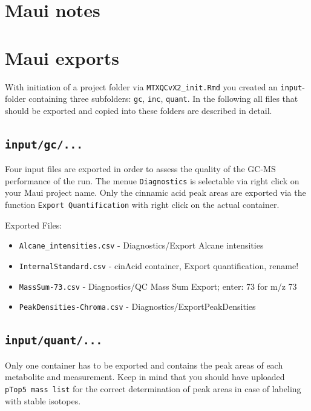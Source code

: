 \documentclass[]{book}
\providecommand{\tightlist}{%
  \setlength{\itemsep}{0pt}\setlength{\parskip}{0pt}}
\theoremstyle{definition}
\theoremstyle{definition}
\theoremstyle{definition}
\theoremstyle{remark}
\begin{document}
\section{Maui notes}\label{maui-notes}

\section{Maui exports}\label{mauiexport}

With initiation of a project folder via \texttt{MTXQCvX2\_init.Rmd} you
created an \texttt{input}-folder containing three subfolders:
\texttt{gc}, \texttt{inc}, \texttt{quant}. In the following all files
that should be exported and copied into these folders are described in
detail.

\subsection{\texorpdfstring{\texttt{input/gc/...}}{input/gc/...}}\label{inputgc...}

Four input files are exported in order to assess the quality of the
GC-MS performance of the run. The menue \texttt{Diagnostics} is
selectable via right click on your Maui project name. Only the cinnamic
acid peak areas are exported via the function
\texttt{Export\ Quantification} with right click on the actual
container.

Exported Files:

\begin{itemize}
\tightlist
\item
  \texttt{Alcane\_intensities.csv} - Diagnostics/Export Alcane
  intensities
\item
  \texttt{InternalStandard.csv} - cinAcid container, Export
  quantification, rename!
\item
  \texttt{MassSum-73.csv} - Diagnostics/QC Mass Sum Export; enter: 73
  for m/z 73
\item
  \texttt{PeakDensities-Chroma.csv} - Diagnostics/ExportPeakDensities
\end{itemize}

\subsection{\texorpdfstring{\texttt{input/quant/...}}{input/quant/...}}\label{inputquant...}

Only one container has to be exported and contains the peak areas of
each metabolite and measurement. Keep in mind that you should have
uploaded \texttt{pTop5\ mass\ list} for the correct determination of
peak areas in case of labeling with stable isotopes.
\end{document}
